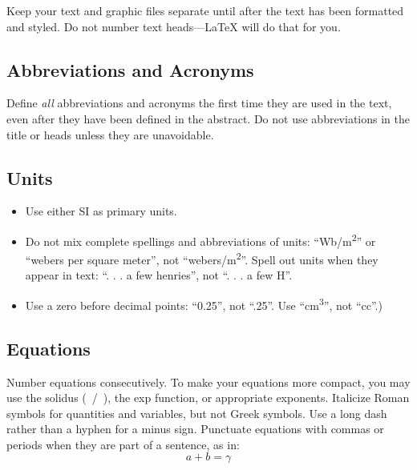 \documentclass[conference]{IEEEtran}
\begin{document}
Keep your text and graphic files separate until after the text has been 
formatted and styled. Do not number text heads---{\LaTeX} will do that for you.

\subsection{Abbreviations and Acronyms}\label{AA}
Define \emph{all} abbreviations and acronyms the first time they are used in the text, even after they have been defined in the abstract. %
Do not use abbreviations in the title or heads unless they are unavoidable.

\subsection{Units}
\begin{itemize}
\item Use either SI as primary units. %
\item Do not mix complete spellings and abbreviations of units: ``Wb/m\textsuperscript{2}'' or ``webers per square meter'', not ``webers/m\textsuperscript{2}''. Spell out units when they appear in text: ``. . . a few henries'', not ``. . . a few H''.
\item Use a zero before decimal points: ``0.25'', not ``.25''. Use ``cm\textsuperscript{3}'', not ``cc''.)
\end{itemize}

\subsection{Equations}
Number equations consecutively. To make your equations more compact, you may use the solidus (~/~), the exp function, or appropriate exponents. Italicize Roman symbols for quantities and variables, but not Greek symbols. Use a long dash rather than a hyphen for a minus sign. Punctuate equations with commas or periods when they are part of a sentence, as in:
\begin{equation}
a+b=\gamma
\label{eq}
\end{equation}
\end{document}

